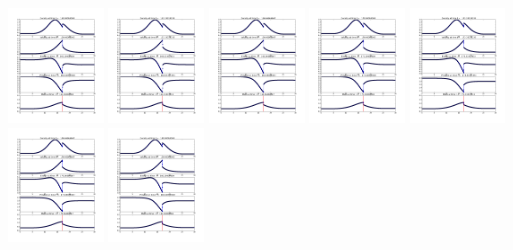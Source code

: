 \documentclass[11pt]{article}
\begin{document}
\vskip 10pt 
\includegraphics[width=0.19\textwidth]{frame0048fig1.png}
\vskip 10pt 
\includegraphics[width=0.19\textwidth]{frame0049fig1.png}
\vskip 10pt 
\includegraphics[width=0.19\textwidth]{frame0050fig1.png}
\vskip 10pt 
\includegraphics[width=0.19\textwidth]{frame0051fig1.png}
\vskip 10pt 
\includegraphics[width=0.19\textwidth]{frame0052fig1.png}
\vskip 10pt 
\includegraphics[width=0.19\textwidth]{frame0053fig1.png}
\vskip 10pt 
\includegraphics[width=0.19\textwidth]{frame0054fig1.png}
\end{document}
